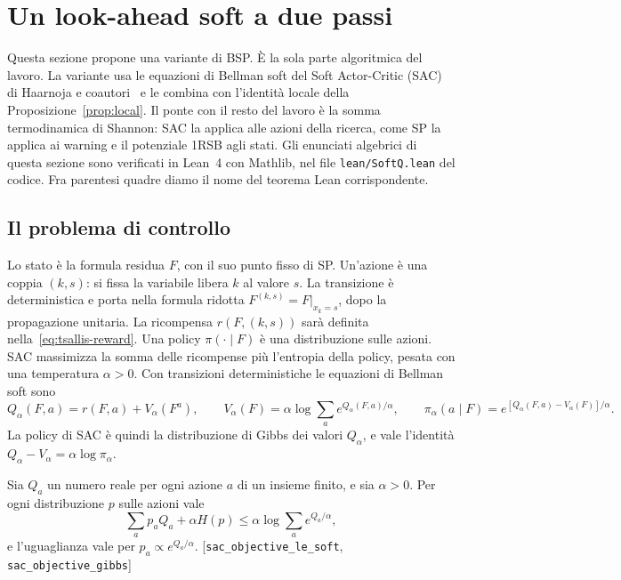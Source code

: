 \section{Un look-ahead soft a due passi}
\label{sec:softq}

Questa sezione propone una variante di BSP.
È la sola parte algoritmica del lavoro.
La variante usa le equazioni di Bellman soft del Soft Actor-Critic (SAC) di Haarnoja e coautori~\citep{haarnoja2018soft} e le combina con l'identità locale della Proposizione~\ref{prop:local}.
Il ponte con il resto del lavoro è la somma termodinamica di Shannon: SAC la applica alle azioni della ricerca, come SP la applica ai warning e il potenziale 1RSB agli stati.
Gli enunciati algebrici di questa sezione sono verificati in Lean~4 con Mathlib, nel file \texttt{lean/SoftQ.lean} del codice.
Fra parentesi quadre diamo il nome del teorema Lean corrispondente.

\subsection{Il problema di controllo}

Lo stato è la formula residua $F$, con il suo punto fisso di SP.
Un'azione è una coppia $(k,s)$: si fissa la variabile libera $k$ al valore $s$.
La transizione è deterministica e porta nella formula ridotta $F^{(k,s)}=F|_{x_k=s}$, dopo la propagazione unitaria.
La ricompensa $r(F,(k,s))$ sarà definita nella~\eqref{eq:tsallis-reward}.
Una policy $\pi(\cdot\mid F)$ è una distribuzione sulle azioni.
SAC massimizza la somma delle ricompense più l'entropia della policy, pesata con una temperatura $\alpha>0$.
Con transizioni deterministiche le equazioni di Bellman soft sono
\begin{equation}
Q_\alpha(F,a)=r(F,a)+V_\alpha(F^{a}),\qquad
V_\alpha(F)=\alpha\log\sum_a e^{Q_\alpha(F,a)/\alpha},\qquad
\pi_\alpha(a\mid F)=e^{[Q_\alpha(F,a)-V_\alpha(F)]/\alpha}.
\label{eq:soft-bellman}
\end{equation}
La policy di SAC è quindi la distribuzione di Gibbs dei valori $Q_\alpha$, e vale l'identità $Q_\alpha-V_\alpha=\alpha\log\pi_\alpha$.

\begin{proposizione}
\label{prop:sac-shannon}
Sia $Q_a$ un numero reale per ogni azione $a$ di un insieme finito, e sia $\alpha>0$.
Per ogni distribuzione $p$ sulle azioni vale
\begin{equation}
\sum_ap_aQ_a+\alpha H(p)\le\alpha\log\sum_ae^{Q_a/\alpha},
\label{eq:sac-bound}
\end{equation}
e l'uguaglianza vale per $p_a\propto e^{Q_a/\alpha}$.
[\texttt{sac\_objective\_le\_soft}, \texttt{sac\_objective\_gibbs}]
\end{proposizione}

